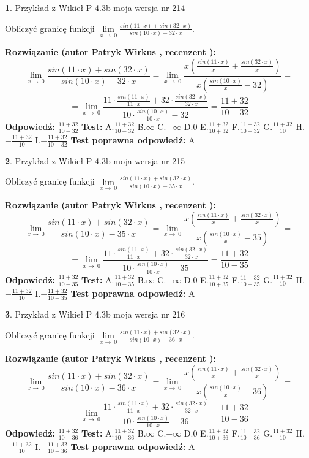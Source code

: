 \documentclass[12pt, a4paper]{article}
\theoremstyle{definition} %
\newtheorem{zad}{}
\newcommand{\zadStart}[1]{\begin{zad}#1\newline}
\newcommand{\zadStop}{\end{zad}}
\newcommand{\rozwStart}[2]{\noindent \textbf{Rozwiązanie (autor #1 , recenzent #2): }\newline}
\newcommand{\rozwStop}{\newline}
\newcommand{\odpStart}{\noindent \textbf{Odpowiedź:}\newline}
\newcommand{\odpStop}{\newline}
\newcommand{\testStart}{\noindent \textbf{Test:}\newline}
\newcommand{\testStop}{\newline}
\newcommand{\kluczStart}{\noindent \textbf{Test poprawna odpowiedź:}\newline}
\newcommand{\kluczStop}{\newline}
\begin{document}
\zadStart{Przykład z Wikieł P 4.3b moja wersja nr 214}


Obliczyć granicę funkcji $\lim\limits_{x\to\ 0}\frac{sin(11 \cdot x)+sin(32 \cdot x)}{sin(10 \cdot x)-32 \cdot x}$.
\zadStop
\rozwStart{Patryk Wirkus}{}
$$\lim\limits_{x\to\ 0}\frac{sin(11 \cdot x)+sin(32 \cdot x)}{sin(10 \cdot x)-32 \cdot x}=\lim\limits_{x\to\ 0}\frac{x(\frac{sin(11 \cdot x)}{x}+\frac{sin(32 \cdot x)}{x})}{x(\frac{sin(10 \cdot x)}{x}-32)}=$$
$$=\lim\limits_{x\to\ 0}\frac{11 \cdot \frac{sin(11 \cdot x)}{11 \cdot x}+32 \cdot \frac{sin(32 \cdot x)}{32 \cdot x}}{10 \cdot \frac{sin(10 \cdot x)}{10 \cdot x}-32}=\frac{11+32}{10-32}$$
\rozwStop
\odpStart
$\frac{11+32}{10-32}$
\odpStop
\testStart
A.$\frac{11+32}{10-32}$
B.$\infty$
C.$-\infty$
D.$0$
E.$\frac{11+32}{10+32}$
F.$\frac{11-32}{10-32}$
G.$\frac{11+32}{10}$
H.$-\frac{11+32}{10}$
I.$-\frac{11+32}{10-32}$
\testStop
\kluczStart
A
\kluczStop



\zadStart{Przykład z Wikieł P 4.3b moja wersja nr 215}


Obliczyć granicę funkcji $\lim\limits_{x\to\ 0}\frac{sin(11 \cdot x)+sin(32 \cdot x)}{sin(10 \cdot x)-35 \cdot x}$.
\zadStop
\rozwStart{Patryk Wirkus}{}
$$\lim\limits_{x\to\ 0}\frac{sin(11 \cdot x)+sin(32 \cdot x)}{sin(10 \cdot x)-35 \cdot x}=\lim\limits_{x\to\ 0}\frac{x(\frac{sin(11 \cdot x)}{x}+\frac{sin(32 \cdot x)}{x})}{x(\frac{sin(10 \cdot x)}{x}-35)}=$$
$$=\lim\limits_{x\to\ 0}\frac{11 \cdot \frac{sin(11 \cdot x)}{11 \cdot x}+32 \cdot \frac{sin(32 \cdot x)}{32 \cdot x}}{10 \cdot \frac{sin(10 \cdot x)}{10 \cdot x}-35}=\frac{11+32}{10-35}$$
\rozwStop
\odpStart
$\frac{11+32}{10-35}$
\odpStop
\testStart
A.$\frac{11+32}{10-35}$
B.$\infty$
C.$-\infty$
D.$0$
E.$\frac{11+32}{10+35}$
F.$\frac{11-32}{10-35}$
G.$\frac{11+32}{10}$
H.$-\frac{11+32}{10}$
I.$-\frac{11+32}{10-35}$
\testStop
\kluczStart
A
\kluczStop



\zadStart{Przykład z Wikieł P 4.3b moja wersja nr 216}


Obliczyć granicę funkcji $\lim\limits_{x\to\ 0}\frac{sin(11 \cdot x)+sin(32 \cdot x)}{sin(10 \cdot x)-36 \cdot x}$.
\zadStop
\rozwStart{Patryk Wirkus}{}
$$\lim\limits_{x\to\ 0}\frac{sin(11 \cdot x)+sin(32 \cdot x)}{sin(10 \cdot x)-36 \cdot x}=\lim\limits_{x\to\ 0}\frac{x(\frac{sin(11 \cdot x)}{x}+\frac{sin(32 \cdot x)}{x})}{x(\frac{sin(10 \cdot x)}{x}-36)}=$$
$$=\lim\limits_{x\to\ 0}\frac{11 \cdot \frac{sin(11 \cdot x)}{11 \cdot x}+32 \cdot \frac{sin(32 \cdot x)}{32 \cdot x}}{10 \cdot \frac{sin(10 \cdot x)}{10 \cdot x}-36}=\frac{11+32}{10-36}$$
\rozwStop
\odpStart
$\frac{11+32}{10-36}$
\odpStop
\testStart
A.$\frac{11+32}{10-36}$
B.$\infty$
C.$-\infty$
D.$0$
E.$\frac{11+32}{10+36}$
F.$\frac{11-32}{10-36}$
G.$\frac{11+32}{10}$
H.$-\frac{11+32}{10}$
I.$-\frac{11+32}{10-36}$
\testStop
\kluczStart
A
\kluczStop
\end{document}
